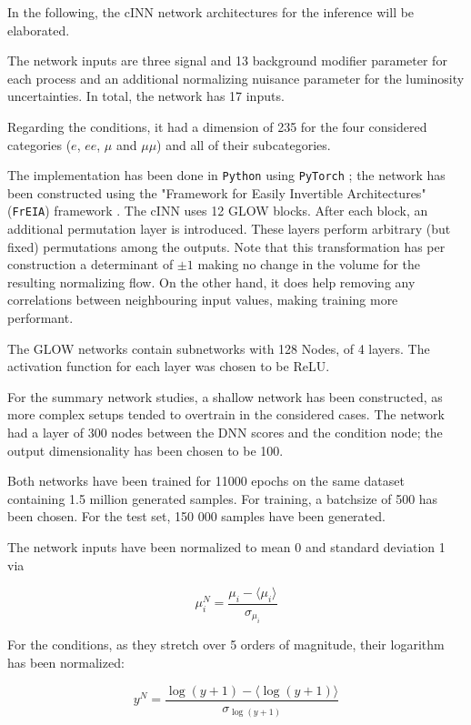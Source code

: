
In the following, the cINN network architectures for the inference will be elaborated.

The network inputs are three signal and 13 background modifier parameter for each process and an additional normalizing nuisance parameter for the luminosity uncertainties. In total, the network has 17 inputs.

Regarding the conditions, it had a dimension of 235 for the four considered categories ($e$, $ee$, $\mu$ and $\mu\mu$) and all of their subcategories.

The implementation has been done in \texttt{Python} using \texttt{PyTorch} \cite{pytorch}; the network has been constructed using the "Framework for Easily Invertible Architectures" (\texttt{FrEIA}) framework \cite{freia}. The cINN uses 12 GLOW blocks. After each block, an additional permutation layer is introduced. These layers perform arbitrary (but fixed) permutations among the outputs. Note that this transformation has per construction a determinant of $\pm1$ making no change in the volume for the resulting normalizing flow. On the other hand, it does help removing any correlations between neighbouring input values, making training more performant.

The GLOW networks contain subnetworks with 128 Nodes, of 4 layers. The activation function for each layer was chosen to be ReLU.

For the summary network studies, a shallow network has been constructed, as more complex setups tended to overtrain in the considered cases. The network had a layer of 300 nodes between the DNN scores and the condition node; the output dimensionality has been chosen to be 100.

Both networks have been trained for 11000 epochs on the same dataset containing 1.5 million generated samples. For training, a batchsize of 500 has been chosen. For the test set, 150 000 samples have been generated.

The network inputs have been normalized to mean 0 and standard deviation 1 via

\begin{equation*}
	\mu^N_i = \frac{\mu_i - \langle\mu_i\rangle}{\sigma_{\mu_i}}
\end{equation*}

For the conditions, as they stretch over 5 orders of magnitude, their logarithm has been normalized:

\begin{equation*}
	y^N = \frac{\log(y+1)-\langle\log(y+1)\rangle}{\sigma_{\log(y+1)}}
\end{equation*}

